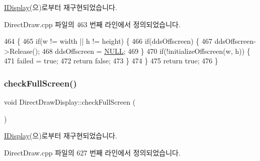 \mbox{\hyperlink{class_i_display_ab6e4355da026afb85710ae3e12329176}{I\+Display}}(으)로부터 재구현되었습니다.



Direct\+Draw.\+cpp 파일의 463 번째 라인에서 정의되었습니다.


\begin{DoxyCode}
464 \{
465   \textcolor{keywordflow}{if}(w != width || h != height) \{
466     \textcolor{keywordflow}{if}(ddsOffscreen) \{
467       ddsOffscreen->Release();
468       ddsOffscreen = \mbox{\hyperlink{getopt1_8c_a070d2ce7b6bb7e5c05602aa8c308d0c4}{NULL}};
469     \}
470     \textcolor{keywordflow}{if}(!initializeOffscreen(w, h)) \{
471       failed = \textcolor{keyword}{true};
472       \textcolor{keywordflow}{return} \textcolor{keyword}{false};
473     \}
474   \}
475   \textcolor{keywordflow}{return} \textcolor{keyword}{true};
476 \}
\end{DoxyCode}
\mbox{\label{class_direct_draw_display_ada4eacae559651471181ec781dce1716}} 
\subsubsection{\texorpdfstring{check\+Full\+Screen()}{checkFullScreen()}}
{\footnotesize\ttfamily void Direct\+Draw\+Display\+::check\+Full\+Screen (\begin{DoxyParamCaption}{ }\end{DoxyParamCaption})\hspace{0.3cm}{\ttfamily [virtual]}}



\mbox{\hyperlink{class_i_display_afcb9df4a4949d13491f9a07a2ce24eb0}{I\+Display}}(으)로부터 재구현되었습니다.



Direct\+Draw.\+cpp 파일의 627 번째 라인에서 정의되었습니다.


